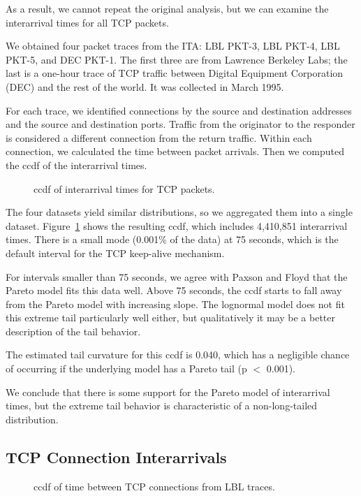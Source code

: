 \documentclass[twocolumn,11pt]{infocom}
\begin{document}
As a result, we cannot repeat the original analysis, but we can
examine the interarrival times for all TCP packets.

We obtained four packet traces from the ITA:
LBL PKT-3, LBL PKT-4, LBL PKT-5, and DEC PKT-1.  The first three
are from Lawrence Berkeley Labs; the last is a one-hour trace
of TCP traffic between Digital Equipment Corporation (DEC) and the
rest of the world.  It was collected in March 1995.

For each trace, we identified connections by the source
and destination addresses and the source and destination ports.
Traffic from the originator to the responder is considered
a different connection from the return traffic.  Within each
connection, we calculated the time between packet arrivals.
Then we computed the ccdf of the interarrival times.

\begin{figure}[tb]
\centerline{}
\caption{ccdf of interarrival times for TCP packets.}
\label{fig.tcp_inter}
\end{figure}

The four datasets yield similar distributions, so we aggregated them
into a single dataset.  Figure~\ref{fig.tcp_inter} shows the resulting
ccdf, which includes 4,410,851 interarrival times.  There is a small
mode (0.001\% of the data) at 75 seconds, which is the default
interval for the TCP keep-alive mechanism.

For intervals smaller than 75 seconds, we agree with Paxson and
Floyd that the Pareto model fits this data well.  Above 75
seconds, the ccdf starts to fall away from the Pareto model with
increasing slope.  The lognormal model does not fit this extreme
tail particularly well either, but qualitatively it may be a better
description of the tail behavior.

The estimated tail curvature for this ccdf is 0.040, which has
a negligible chance of occurring if the underlying model has
a Pareto tail (p $<$ 0.001).

We conclude that there is some support for the Pareto model of
interarrival times, but the extreme tail behavior is characteristic of
a non-long-tailed distribution.


\subsection {TCP Connection Interarrivals}

\begin{figure}[tb]
\centerline{}
\caption{ccdf of time between TCP connections from LBL traces.}
\label{fig.conn}
\end{figure}
\end{document}
